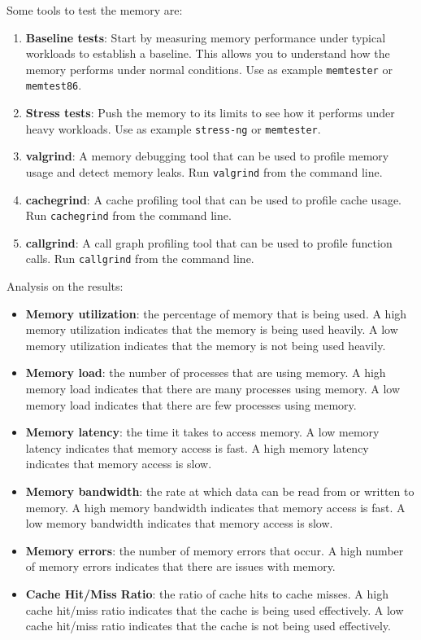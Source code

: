 Some tools to test the memory are:
\begin{enumerate}
    \item \textbf{Baseline tests}: Start by measuring memory performance under typical workloads to establish a baseline. This allows you to understand how the memory performs under normal conditions. Use as example \texttt{memtester} or \texttt{memtest86}.
    \item \textbf{Stress tests}: Push the memory to its limits to see how it performs under heavy workloads. Use as example \texttt{stress-ng} or \texttt{memtester}.
    \item \textbf{valgrind}: A memory debugging tool that can be used to profile memory usage and detect memory leaks. Run \texttt{valgrind} from the command line.
    \item \textbf{cachegrind}: A cache profiling tool that can be used to profile cache usage. Run \texttt{cachegrind} from the command line.
    \item \textbf{callgrind}: A call graph profiling tool that can be used to profile function calls. Run \texttt{callgrind} from the command line.
\end{enumerate}

Analysis on the results:
\begin{itemize}
    \item \textbf{Memory utilization}: the percentage of memory that is being used. A high memory utilization indicates that the memory is being used heavily. A low memory utilization indicates that the memory is not being used heavily.
    \item \textbf{Memory load}: the number of processes that are using memory. A high memory load indicates that there are many processes using memory. A low memory load indicates that there are few processes using memory.
    \item \textbf{Memory latency}: the time it takes to access memory. A low memory latency indicates that memory access is fast. A high memory latency indicates that memory access is slow.
    \item \textbf{Memory bandwidth}: the rate at which data can be read from or written to memory. A high memory bandwidth indicates that memory access is fast. A low memory bandwidth indicates that memory access is slow.
    \item \textbf{Memory errors}: the number of memory errors that occur. A high number of memory errors indicates that there are issues with memory.
    \item \textbf{Cache Hit/Miss Ratio}: the ratio of cache hits to cache misses. A high cache hit/miss ratio indicates that the cache is being used effectively. A low cache hit/miss ratio indicates that the cache is not being used effectively.
\end{itemize}

